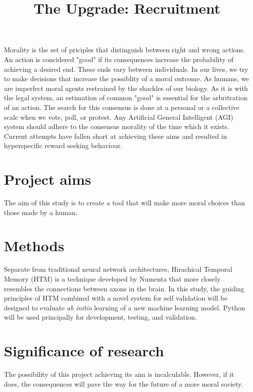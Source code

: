 \documentclass[12pt]{article}
\title{The Upgrade: Recruitment}
\date{\vspace{-5ex}}
\author{\vspace{-5ex}}
\begin{document}
\maketitle

Morality is the set of priciples that distinguish between right and wrong actions. An action is concidered "good" if its consequences increase the probability of achieving a desired end. These ends vary between individuals. In our lives, we try to make decisions that increase the possiblity of a moral outcome. As humans, we are imperfect moral agents restrained by the shackles of our biology.  As it is with the legal system, an estimation of common "good" is essential for the arbritration of an action. The search for this consensus is done at a personal or a collective scale when we vote, poll, or protest. Any Artificial General Intelligent (AGI) system should adhere to the consensus morality of the time which it exists. Current attempts have fallen short at achieving these aims and resulted in hyperspecific reward seeking behaviour.

\section*{Project aims}
The aim of this study is to create a tool that will make more moral choices than those made by a human. 

\section*{Methods}
Separate from traditional neural network architectures, Hirachical Temporal Memory (HTM) is a technique developed by Numenta that more closely resembles the connections between axons in the brain. In this study, the guiding principles of HTM combined with a novel system for self validation will be designed to evaluate \emph{ab initio} learning of a new machine learning model. Python will be used principally for development, testing, and validation.

\section*{Significance of research}
The possibility of this project achieving its aim is incalculable. However, if it does, the consequences will pave the way for the future of a more moral society.
\end{document}
